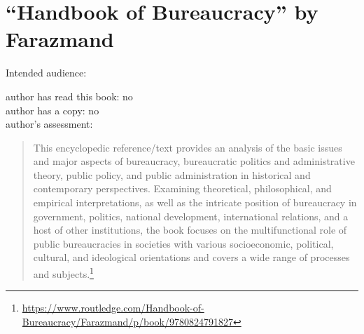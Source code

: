 \section{``Handbook of Bureaucracy'' by Farazmand\label{review:farazmand_handbook}}

\cite{1994_Farazmand}

Intended audience:

author has read this book: no\\
author has a copy: no\\
author's assessment:


\begin{quote}
    This encyclopedic reference/text provides an analysis of the basic issues and major aspects of bureaucracy, bureaucratic politics and administrative theory, public policy, and public administration in historical and contemporary perspectives. Examining theoretical, philosophical, and empirical interpretations, as well as the intricate position of bureaucracy in government, politics, national development, international relations, and a host of other institutions, the book focuses on the multifunctional role of public bureaucracies in societies with various socioeconomic, political, cultural, and ideological orientations and covers a wide range of processes and subjects.\footnote{\href{https://www.routledge.com/Handbook-of-Bureaucracy/Farazmand/p/book/9780824791827}{https://www.routledge.com/Handbook-of-Bureaucracy/Farazmand/p/book/9780824791827}}
\end{quote}